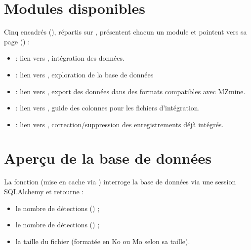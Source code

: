 \documentclass[letterpaper,10pt,english]{sphinxmanual}
\begin{document}
\section{Modules disponibles}
\label{\detokenize{Home:modules-disponibles}}
\sphinxAtStartPar
Cinq encadrés (), répartis sur ,
présentent chacun un module et pointent vers sa page () :
\begin{itemize}
\item {} 
\sphinxAtStartPar
{} : lien vers , intégration des données.

\item {} 
\sphinxAtStartPar
{} : lien vers , exploration de la base de données 

\item {} 
\sphinxAtStartPar
{} : lien vers , export des données dans des formats compatibles avec MZmine.

\item {} 
\sphinxAtStartPar
{} : lien vers , guide des colonnes pour les fichiers d’intégration.

\item {} 
\sphinxAtStartPar
{} : lien vers , correction/suppression des enregistrements déjà intégrés.

\end{itemize}


\section{Aperçu de la base de données}
\label{\detokenize{Home:apercu-de-la-base-de-donnees}}
\sphinxAtStartPar
La fonction  (mise en cache via )
interroge la base de données via une session SQLAlchemy et retourne :
\begin{itemize}
\item {} 
\sphinxAtStartPar
le nombre de détections  () ;

\item {} 
\sphinxAtStartPar
le nombre de détections  () ;

\item {} 
\sphinxAtStartPar
la taille du fichier  (formatée en Ko ou Mo selon sa taille).

\end{itemize}
\end{document}
